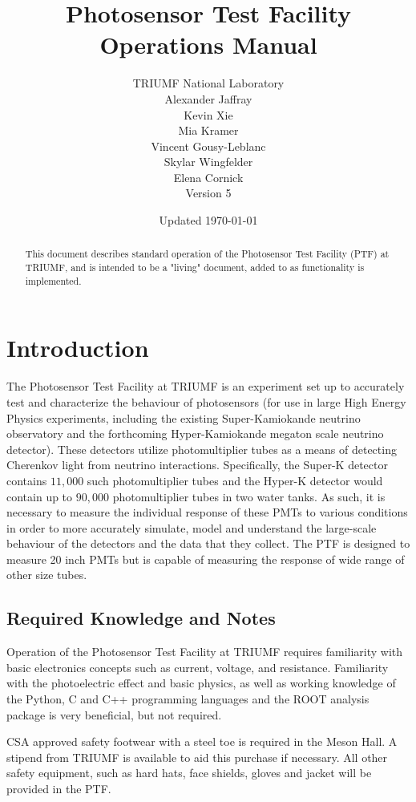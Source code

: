 \documentclass[twoside,letterpaper]{refart}
\title{Photosensor Test Facility Operations Manual}
\author{TRIUMF National Laboratory \\
Alexander Jaffray \\
Kevin Xie \\
Mia Kramer \\
Vincent Gousy-Leblanc \\
Skylar Wingfelder\\
Elena Cornick \\
Version 5}
\date{Updated \today}
\begin{document}
\maketitle

\begin{abstract}
	This document describes standard operation of the Photosensor Test Facility (PTF) at TRIUMF, and is intended to be a "living" document, added to as functionality is implemented.
\end{abstract}
\tableofcontents

\newpage



\section{Introduction}

The Photosensor Test Facility at TRIUMF is an experiment set up to accurately test and characterize the behaviour of photosensors (for use in large High Energy Physics experiments, including the existing Super-Kamiokande neutrino observatory and the forthcoming Hyper-Kamiokande megaton scale neutrino detector). These detectors utilize photomultiplier tubes as a means of detecting Cherenkov light from neutrino interactions. Specifically, the Super-K detector contains $11,000$ such photomultiplier tubes and the Hyper-K detector would contain up to $90,000$ photomultiplier tubes in two water tanks. As such, it is necessary to measure the individual response of these PMTs to various conditions in order to more accurately simulate, model and understand the large-scale behaviour of the detectors and the data that they collect. The PTF is designed to measure 20 inch PMTs but is capable of measuring the response of wide range of other size tubes.

\subsection{Required Knowledge and Notes}

Operation of the Photosensor Test Facility at TRIUMF requires familiarity with basic electronics concepts such as current, voltage, and resistance. Familiarity with the photoelectric effect and basic physics, as well as working knowledge of the Python, C and C++ programming languages and the ROOT analysis package is very beneficial, but not required.

CSA approved safety footwear with a steel toe is required in the Meson Hall. A stipend from TRIUMF is available to aid this purchase if necessary. All other safety equipment, such as hard hats, face shields, gloves and jacket will be provided in the PTF.
\end{document}
